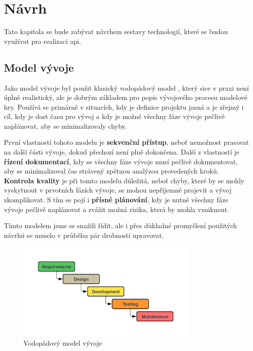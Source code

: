 \chapter{Návrh}\label{chap:design}
Tato kapitola se bude zabývat návrhem sestavy technologií, které se budou využívat pro realizaci \gls{api}.

\section{Model vývoje}\label{sec:development_model}
Jako model vývoje byl použit klasický vodopádový model , který sice v praxi není úplně realistický, ale je dobrým základem pro popis vývojového procesu modelové hry. Používá se primárně v situacích, kdy je definice projektu jasná a je zřejmý i cíl, kdy je dost času pro vývoj a kdy je možné všechny fáze vývoje pečlivě naplánovat, aby se minimalizovaly chyby.

První vlastností tohoto modelu je \textbf{sekvenční přístup}, neboť nemožnost pracovat na další části vývoje, dokud přechozí není plně dokončena. Další z vlastností je \textbf{řízení dokumentací}, kdy se všechny fáze vývoje musí pečlivě dokumentovat, aby se minimalizoval čas strávený zpětnou analýzou provedených kroků. \textbf{Kontrola kvality} je při tomto modelu důležitá, neboť chyby, které by se mohly vyskytnout v prvotních fázích vývoje, se mohou nepříjemně projevit a vývoj zkomplikovat. S tím se pojí i \textbf{přísné plánování}, kdy je nutné všechny fáze vývoje pečlivě naplánovat a zvážit možná rizika, která by mohla vzniknout.\cite{geeksForGeeks:waterfall}

Tímto modelem jsme se snažili řídit, ale i přes důkladné promyšlení použitých návrhů se muselo v průběhu pár drobností upravovat. 

\begin{figure}[!ht]
    \centering
    \includegraphics[width=0.8\textwidth]{figures/impl/API Implementation - waterfall model.pdf}
    \caption{Vodopádový model vývoje}\label{fig:waterfall}
\end{figure}

